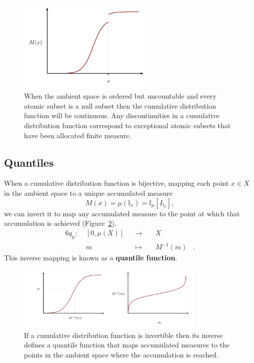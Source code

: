 \documentclass[
  letterpaper,
  DIV=11,
  numbers=noendperiod]{scrartcl}
\begin{document}
\begin{figure}

{\centering \includegraphics[width=0.6\textwidth,height=\textheight]{figures/cdfs/jump/jump.pdf}

}

\caption{\label{fig-cdf-jump}When the ambient space is ordered but
uncountable and every atomic subset is a null subset then the cumulative
distribution function will be continuous. Any discontinuities in a
cumulative distribution function correspond to exceptional atomic
subsets that have been allocated finite measure.}

\end{figure}

\hypertarget{quantiles}{%
\subsection{Quantiles}\label{quantiles}}

When a cumulative distribution function is bijective, mapping each point
\(x \in X\) in the ambient space to a unique accumulated measure \[
M(x) = \mu(\mathbb{I}_{x}) = \mathbb{I}_{\mu}[I_{\mathbb{I}_{x}}],
\] we can invert it to map any accumulated measure to the point at which
that accumulation is achieved (Figure~\ref{fig-quantile-function}),
\begin{alignat*}{6}
q_{\mu} :\; & [0, \mu(X)] & &\rightarrow& \; &X&
\\
& m & &\mapsto& & M^{-1}(m) &.
\end{alignat*} This inverse mapping is known as a \textbf{quantile
function}.

\begin{figure}

{\centering \includegraphics[width=0.8\textwidth,height=\textheight]{figures/quantiles/quantile_function/quantile_function.pdf}

}

\caption{\label{fig-quantile-function}If a cumulative distribution
function is invertible then its inverse defines a quantile function that
maps accumulated measures to the points in the ambient space where the
accumulation is reached.}

\end{figure}
\end{document}
